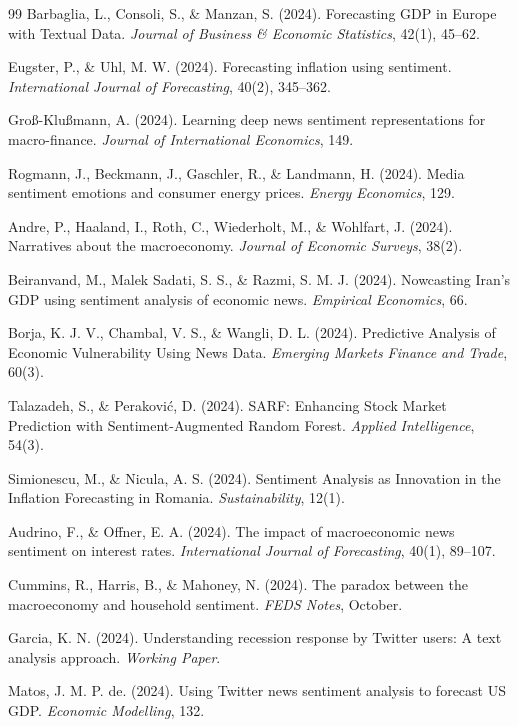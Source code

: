 \documentclass[11pt]{article}
\begin{document}
\begin{thebibliography}{99}
 Barbaglia, L., Consoli, S., \& Manzan, S. (2024). Forecasting GDP in Europe with Textual Data. \textit{Journal of Business \& Economic Statistics}, 42(1), 45--62.

 Eugster, P., \& Uhl, M. W. (2024). Forecasting inflation using sentiment. \textit{International Journal of Forecasting}, 40(2), 345--362.

 Groß-Klußmann, A. (2024). Learning deep news sentiment representations for macro-finance. \textit{Journal of International Economics}, 149.

 Rogmann, J., Beckmann, J., Gaschler, R., \& Landmann, H. (2024). Media sentiment emotions and consumer energy prices. \textit{Energy Economics}, 129.

 Andre, P., Haaland, I., Roth, C., Wiederholt, M., \& Wohlfart, J. (2024). Narratives about the macroeconomy. \textit{Journal of Economic Surveys}, 38(2).

 Beiranvand, M., Malek Sadati, S. S., \& Razmi, S. M. J. (2024). Nowcasting Iran's GDP using sentiment analysis of economic news. \textit{Empirical Economics}, 66.

 Borja, K. J. V., Chambal, V. S., \& Wangli, D. L. (2024). Predictive Analysis of Economic Vulnerability Using News Data. \textit{Emerging Markets Finance and Trade}, 60(3).

 Talazadeh, S., \& Peraković, D. (2024). SARF: Enhancing Stock Market Prediction with Sentiment-Augmented Random Forest. \textit{Applied Intelligence}, 54(3).

 Simionescu, M., \& Nicula, A. S. (2024). Sentiment Analysis as Innovation in the Inflation Forecasting in Romania. \textit{Sustainability}, 12(1).

 Audrino, F., \& Offner, E. A. (2024). The impact of macroeconomic news sentiment on interest rates. \textit{International Journal of Forecasting}, 40(1), 89--107.

 Cummins, R., Harris, B., \& Mahoney, N. (2024). The paradox between the macroeconomy and household sentiment. \textit{FEDS Notes}, October.

 Garcia, K. N. (2024). Understanding recession response by Twitter users: A text analysis approach. \textit{Working Paper}.

 Matos, J. M. P. de. (2024). Using Twitter news sentiment analysis to forecast US GDP. \textit{Economic Modelling}, 132.


\end{thebibliography}
\end{document}
